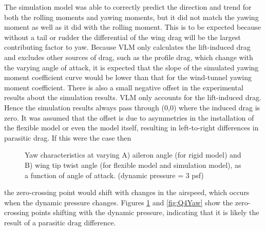 \documentclass[11pt]{ucthesis}
\begin{document}
The simulation model was able to correctly predict the direction and trend for both the rolling moments and yawing moments, but it did not match the yawing moment as well as it did with the rolling moment. This is to be expected because without a tail or rudder the differential of the wing drag will be the largest contributing factor to yaw. Because VLM only calculates the lift-induced drag and excludes other sources of drag, such as the profile drag, which change with the varying angle of attack, it is expected that the slope of the simulated yawing moment coefficient curve would be lower than that for the wind-tunnel yawing moment coefficient. There is also a small negative offset in the experimental results about the simulation results. VLM only accounts for the lift-induced drag. Hence the simulation results always pass through (0,0) where the induced drag is zero. It was assumed that the offset is due to asymmetries in the installation of the flexible model or even the model itself, resulting in left-to-right differences in parasitic drag. If this were the case then 

\begin{figure}[thpb]
\hfill
{}
\hfill
{}
\hfill
\caption{Yaw characteristics at varying A) aileron angle (for rigid model) and B) wing tip twist angle (for flexible model and simulation model), as a function of angle of attack. (dynamic pressure = 3 psf)}
\label{fig:Q3Yaw}
\end{figure}

the zero-crossing point would shift with changes in the airspeed, which occurs when the dynamic pressure changes. Figures \ref{fig:Q3Yaw} and \ref{fig:Q4Yaw} show the zero-crossing points shifting with the dynamic pressure, indicating that it is likely the result of a parasitic drag difference.
\end{document}
